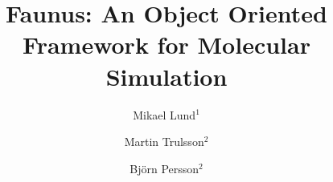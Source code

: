 \documentclass[10pt]{bmc_article}
\newenvironment{bmcformat}{\fussy\setboolean{publ}{true}}{\fussy}
\begin{document}
\begin{bmcformat}



\title{Faunus: An Object Oriented Framework for Molecular Si\-mu\-la\-tion}
 


\author{
Mikael Lund\correspondingauthor$^{1}$%
\and
Martin Trulsson$^{2}$
\and
Bj\"orn Persson$^{2}$
      }
      

\address{%
    \iid(1) Institute of Organic Chemistry and Biochemistry, The Academy of Sciences of the Czech Republic, Flemingovo nam.2, CZ-16610 Prague 6, Czech Republic.
     \iid(2) Department of Theoretical Chemistry,
     University of Lund, P.O.B 124 SE-22100 Lund, Sweden.
}%

\maketitle




\end{bmcformat}
\end{document}

